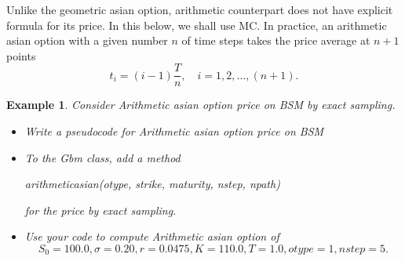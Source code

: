 \documentclass{article}
\newtheorem{example}{Example}
\begin{document}
Unlike the geometric asian option, arithmetic counterpart does not have explicit formula for its price.
In this below, we shall use MC. 
In practice, an arithmetic asian option with a given number $n$ 
of time steps takes the price average at $n+1$ points
$$t_i = (i-1) \frac{T}{n}, \quad i = 1, 2, \ldots, (n+1).$$

\begin{example}\label{exm:aao}  Consider  Arithmetic asian option price on BSM by exact sampling.
\begin{itemize}
\item Write a pseudocode for Arithmetic asian option price on BSM
\item To the Gbm class, add a method \begin{center} {\it arithmeticasian(otype, strike, maturity, nstep, npath)} \end{center} 
for the price by exact sampling.
\item Use your code to compute Arithmetic asian option of 
$$S_0 = 100.0, \sigma= 0.20, r=0.0475, K = 110.0, T = 1.0, otype = 1, nstep = 5.$$
\end{itemize}
\end{example}
\end{document}
